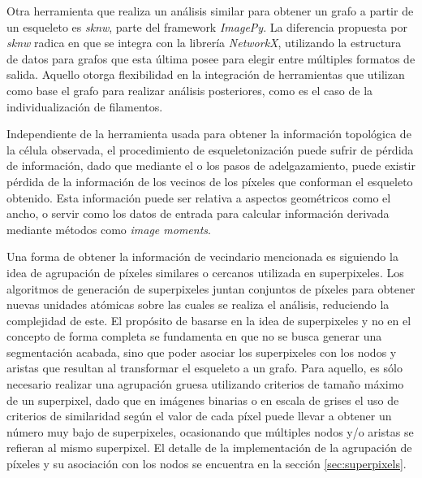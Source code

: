 Otra herramienta que realiza un an\'alisis similar para obtener un grafo a partir de un esqueleto es {\it sknw}, parte del framework {\it ImagePy}\cite{wang2018imagepy}. La diferencia propuesta por {\it sknw} radica en que se integra con la librer\'ia {\it NetworkX}\cite{hagberg2008exploring}, utilizando la estructura de datos para grafos que esta \'ultima posee para elegir entre m\'ultiples formatos de salida. Aquello otorga flexibilidad en la integraci\'on de herramientas que utilizan como base el grafo para realizar an\'alisis posteriores, como es el caso de la individualizaci\'on de filamentos.


Independiente de la herramienta usada para obtener la informaci\'on topol\'ogica de la c\'elula observada, el procedimiento de esqueletonizaci\'on puede sufrir de p\'erdida de informaci\'on, dado que mediante el o los pasos de adelgazamiento, puede existir p\'erdida de la informaci\'on de los vecinos de los p\'ixeles que conforman el esqueleto obtenido. Esta informaci\'on puede ser relativa a aspectos geom\'etricos como el ancho, o servir como los datos de entrada para calcular informaci\'on derivada mediante m\'etodos como {\it image moments}\cite{flusser2009moments}\cite{chaumette2004image}.

Una forma de obtener la informaci\'on de vecindario mencionada es siguiendo la idea de agrupaci\'on de p\'ixeles similares o cercanos utilizada en superpixeles\cite{achanta2012slic}. Los algoritmos de generaci\'on de superpixeles juntan conjuntos de p\'ixeles para obtener nuevas unidades at\'omicas sobre las cuales se realiza el an\'alisis, reduciendo la complejidad de este. El prop\'osito de basarse en la idea de superpixeles y no en el concepto de forma completa se fundamenta en que no se busca generar una segmentaci\'on acabada, sino que poder asociar los superpixeles con los nodos y aristas que resultan al transformar el esqueleto a un grafo. Para aquello, es s\'olo necesario realizar una agrupaci\'on gruesa utilizando criterios de tama\~no m\'aximo de un superpixel, dado que en im\'agenes binarias o en escala de grises el uso de criterios de similaridad seg\'un el valor de cada p\'ixel puede llevar a obtener un n\'umero muy bajo de superpixeles, ocasionando que m\'ultiples nodos y/o aristas se refieran al mismo superpixel. El detalle de la implementaci\'on de la agrupaci\'on de p\'ixeles y su asociaci\'on con los nodos se encuentra en la secci\'on \ref{sec:superpixels}.



